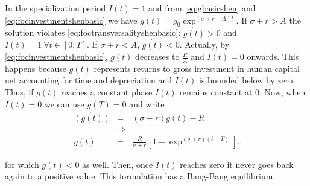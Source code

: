 \indent In the specialization period $I(t) = 1$ and from \eqref{eq:gbasicshen} and \eqref{eq:focinvestmentshenbasic} we have $g(t) = g_{0                                                                                                                                                                                                                                                                                                                                                                                                                                                                                                                                                                                                                                                                                                                                                                                                                                                                                                                                                                                                                                                                                                                                                                                                                                                                                                               } \exp^{(\sigma + r - A)t}$. If $\sigma + r > A$ the solution violates \eqref{eq:foctransversalityshenbasic}: $\dot{g(t)}>0$ and $I(t) = 1 \ \forall t \in [0,T]$. If $\sigma + r < A$, $\dot{g(t)}<0$. Actually, by \eqref{eq:focinvestmentshenbasic}, $g(t)$ decreases to $\frac{R}{A}$ and $I(t) = 0$ onwards. This happens because $g(t)$ represents returns to gross investment in human capital net accounting for time and depreciation and $I(t)$ is bounded below by zero. Thus, if $g(t)$ reaches a constant phase $I(t)$ remains constant at $0$. Now, when $I(t) = 0$ we can use $g(T) = 0$ and write
\begin{eqnarray}
\dot{(g(t))} &=& (\sigma + r)g(t) - R \nonumber \\
&\Rightarrow& \nonumber \\ 
g(t) &=& \frac{R}{\sigma + r} \left[1 - \exp^{(\sigma + r)(t-T)} \right] \label{eq:gshenbasei0}.
\end{eqnarray}

\noindent for which $\dot{g(t)}<0$ as well. Then, once $I(t)$ reaches zero it never goes back again to a positive value. This formulation has a Bang-Bang equilibrium.

